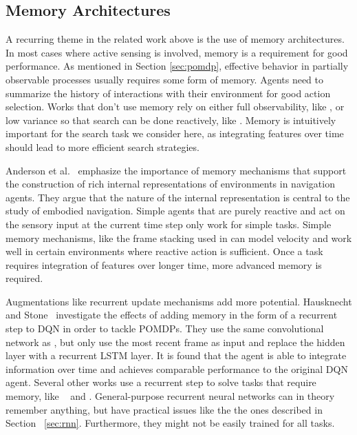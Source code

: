 
\subsection{Memory Architectures}

A recurring theme in the related work above is the use of memory architectures.
In most cases where active sensing is involved, memory is a requirement for good performance.
As mentioned in Section \ref{sec:pomdp}, effective behavior in partially observable processes usually requires some form of memory.
Agents need to summarize the history of interactions with their environment for good action selection.
Works that don't use memory rely on either full observability, like \cite{caicedo_active_2015}, or low variance so that search can be done reactively, like \cite{ghesu_artificial_2016}.
Memory is intuitively important for the search task we consider here, as integrating features over time should lead to more efficient search strategies.

Anderson et al.~\cite{anderson_evaluation_2018} emphasize the importance of memory mechanisms that support the construction of rich internal representations of environments in navigation agents.
They argue that the nature of the internal representation is central to the study of embodied navigation.
Simple agents that are purely reactive and act on the sensory input at the current time step only work for simple tasks.
Simple memory mechanisms, like the frame stacking used in \cite{mnih_human_2015} can model velocity and work well in certain environments where reactive action is sufficient.
Once a task requires integration of features over longer time, more advanced memory is required.

Augmentations like recurrent update mechanisms add more potential.
Hausknecht and Stone~\cite{hausknecht_stone_2017} investigate the effects of adding memory in the form of a recurrent step to DQN in order to tackle POMDPs.
They use the same convolutional network as \cite{mnih_human_2015}, but only use the most recent frame as input and replace the hidden layer with a recurrent LSTM layer.
It is found that the agent is able to integrate information over time and achieves comparable performance to the original DQN agent.
Several other works use a recurrent step to solve tasks that require memory, like ~\cite{mnih_attention_2014} and \cite{mnih_asynchronous_2016}.
General-purpose recurrent neural networks can in theory remember anything, but have practical issues like the the ones described in Section ~\ref{sec:rnn}.
Furthermore, they might not be easily trained for all tasks.

